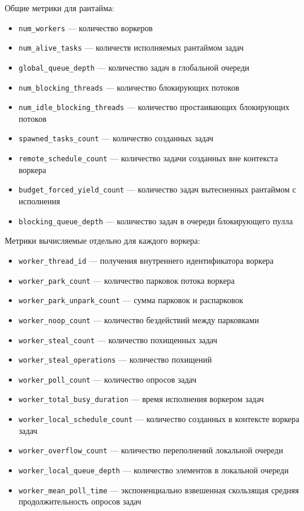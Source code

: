 Общие метрики для рантайма:

\begin{itemize}
    \item \verb|num_workers| --- количество воркеров
    \item \verb|num_alive_tasks| --- количеств исполняемых рантаймом задач
    \item \verb|global_queue_depth| --- количество задач в глобальной очереди
    \item \verb|num_blocking_threads| --- количество блокирующих потоков
    \item \verb|num_idle_blocking_threads| --- количество простаивающих блокирующих потоков
    \item \verb|spawned_tasks_count| --- количество созданных задач
    \item \verb|remote_schedule_count| --- количество задачи созданных вне контекста воркера
    \item \verb|budget_forced_yield_count| --- количество задач вытесненных рантаймом с исполнения
    \item \verb|blocking_queue_depth| --- количество задач в очереди блокирующего пулла
\end{itemize}

Метрики вычисляемые отдельно для каждого воркера:

\begin{itemize}
    \item \verb|worker_thread_id| --- получения внутреннего идентификатора воркера
    \item \verb|worker_park_count| --- количество парковок потока воркера
    \item \verb|worker_park_unpark_count| --- сумма парковок и распарковок
    \item \verb|worker_noop_count| --- количество бездействий между парковками
    \item \verb|worker_steal_count| --- количество похищенных задач
    \item \verb|worker_steal_operations| --- количество похищений
    \item \verb|worker_poll_count| --- количество опросов задач
    \item \verb|worker_total_busy_duration| --- время исполнения воркером задач
    \item \verb|worker_local_schedule_count| --- количество созданных в контексте воркера задач
    \item \verb|worker_overflow_count| --- количество переполнений локальной очереди
    \item \verb|worker_local_queue_depth| --- количество элементов в локальной очереди
    \item \verb|worker_mean_poll_time| --- экспоненциально взвешенная скользящая средняя продолжительность опросов задач
\end{itemize}

